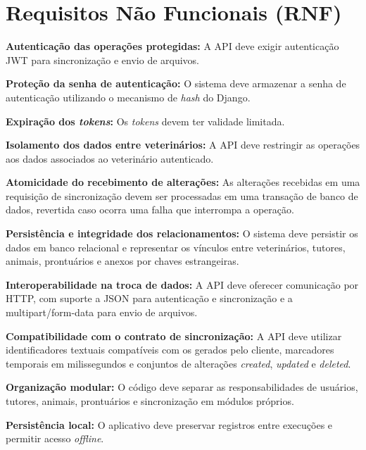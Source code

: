 \newpage
\section{Requisitos Não Funcionais (RNF)}
\label{sec:ap_rnf}

\begin{description}[leftmargin=2.1cm, labelwidth=1.8cm, itemsep=0.5em]
    \item[RNF01] \textbf{Autenticação das operações protegidas:} A API deve exigir autenticação JWT para sincronização e envio de arquivos.
    \item[RNF02] \textbf{Proteção da senha de autenticação:} O sistema deve armazenar a senha de autenticação utilizando o mecanismo de \textit{hash} do Django.
    \item[RNF03] \textbf{Expiração dos \textit{tokens}:} Os \textit{tokens} devem ter validade limitada.
    \item[RNF04] \textbf{Isolamento dos dados entre veterinários:} A API deve restringir as operações aos dados associados ao veterinário autenticado.
    \item[RNF05] \textbf{Atomicidade do recebimento de alterações:} As alterações recebidas em uma requisição de sincronização devem ser processadas em uma transação de banco de dados, revertida caso ocorra uma falha que interrompa a operação.
    \item[RNF06] \textbf{Persistência e integridade dos relacionamentos:} O sistema deve persistir os dados em banco relacional e representar os vínculos entre veterinários, tutores, animais, prontuários e anexos por chaves estrangeiras.
    \item[RNF07] \textbf{Interoperabilidade na troca de dados:} A API deve oferecer comunicação por HTTP, com suporte a JSON para autenticação e sincronização e a multipart/form-data para envio de arquivos.
    \item[RNF08] \textbf{Compatibilidade com o contrato de sincronização:} A API deve utilizar identificadores textuais compatíveis com os gerados pelo cliente, marcadores temporais em milissegundos e conjuntos de alterações \textit{created}, \textit{updated} e \textit{deleted}.
    \item[RNF09] \textbf{Organização modular:} O código deve separar as responsabilidades de usuários, tutores, animais, prontuários e sincronização em módulos próprios.
    \item[RNF10] \textbf{Persistência local:} O aplicativo deve preservar registros entre execuções e permitir acesso \textit{offline}.

\end{description}

